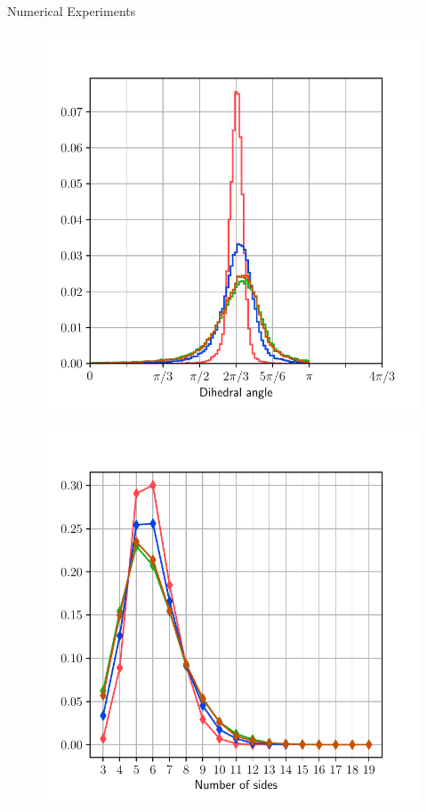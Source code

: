 \documentclass[usenames,dvipsnames]{beamer}
\begin{document}
\begin{frame}{Numerical Experiments}
\vspace{-0.5em}
\begin{minipage}{0.5\textwidth}
\begin{figure}
    \includegraphics[trim={0 1em 0 3em},clip=true,scale=0.35]{figures/coupled_model/alt/ang.pdf}
\end{figure}
\end{minipage}%
\begin{minipage}{0.5\textwidth}
\begin{figure}
   \includegraphics[trim={0 1em 0 3em},clip=true,scale=0.35]{figures/coupled_model/alt/nsides.pdf}

\end{figure}
\end{minipage}
\end{frame}
\end{document}
